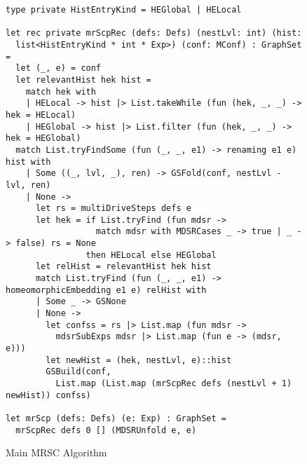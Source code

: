 \documentclass[submission,copyright,creativecommons]{eptcs}
\begin{document}
\begin{figure}
\begin{lstlisting}
type private HistEntryKind = HEGlobal | HELocal

let rec private mrScpRec (defs: Defs) (nestLvl: int) (hist: 
  list<HistEntryKind * int * Exp>) (conf: MConf) : GraphSet =
  let (_, e) = conf
  let relevantHist hek hist =
    match hek with
    | HELocal -> hist |> List.takeWhile (fun (hek, _, _) -> hek = HELocal)
    | HEGlobal -> hist |> List.filter (fun (hek, _, _) -> hek = HEGlobal)
  match List.tryFindSome (fun (_, _, e1) -> renaming e1 e) hist with
    | Some ((_, lvl, _), ren) -> GSFold(conf, nestLvl - lvl, ren)
    | None ->
      let rs = multiDriveSteps defs e
      let hek = if List.tryFind (fun mdsr -> 
                  match mdsr with MDSRCases _ -> true | _ -> false) rs = None
                then HELocal else HEGlobal
      let relHist = relevantHist hek hist
      match List.tryFind (fun (_, _, e1) -> homeomorphicEmbedding e1 e) relHist with
      | Some _ -> GSNone
      | None ->
        let confss = rs |> List.map (fun mdsr -> 
          mdsrSubExps mdsr |> List.map (fun e -> (mdsr, e)))
        let newHist = (hek, nestLvl, e)::hist
        GSBuild(conf, 
          List.map (List.map (mrScpRec defs (nestLvl + 1) newHist)) confss)

let mrScp (defs: Defs) (e: Exp) : GraphSet =
  mrScpRec defs 0 [] (MDSRUnfold e, e)
\end{lstlisting}
\caption{Main MRSC Algorithm}
\label{fig:MRSCAlg}
\end{figure}
\end{document}
